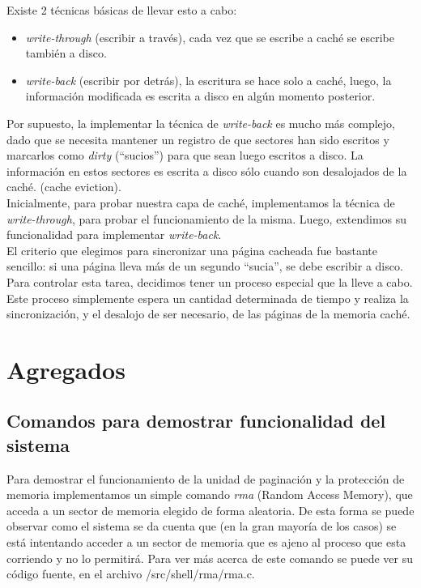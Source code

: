 \documentclass[a4paper,10pt]{article}
\begin{document}
        Existe 2 técnicas básicas de llevar esto a cabo:

        \begin{itemize}
        \item \textit{write-through} (escribir a través), cada vez que se escribe a caché se escribe también a disco.
        \item \textit{write-back} (escribir por detrás), la escritura se hace solo a caché, luego, la información modificada es escrita a disco en algún momento posterior.
        \end{itemize}

        Por supuesto, la implementar la técnica de \textit{write-back} es mucho más complejo, dado que se necesita mantener un registro de que sectores han sido escritos y 
        marcarlos como \textit{dirty} (``sucios'') para que sean luego escritos a disco. La información en estos sectores es escrita a disco sólo cuando son desalojados
        de la caché. (cache eviction). \\

        Inicialmente, para probar nuestra capa de caché, implementamos la técnica de \textit{write-through}, para probar el funcionamiento de la misma. 
        Luego, extendimos su funcionalidad para implementar \textit{write-back}. \\

        El criterio que elegimos para sincronizar una página cacheada fue bastante sencillo: si una página lleva más de un segundo ``sucia'', se debe escribir a disco.
        Para controlar esta tarea, decidimos tener un proceso especial que la lleve a cabo. Este proceso simplemente espera un cantidad determinada de tiempo y realiza 
        la sincronización, y el desalojo de ser necesario, de las páginas de la memoria caché.


\newpage
\section{Agregados}

        \subsection{Comandos para demostrar funcionalidad del sistema}
        
        Para demostrar el funcionamiento de la unidad de paginación y la protección de memoria implementamos un simple comando \textit{rma} (Random Access Memory), 
        que acceda a un sector de memoria elegido de forma aleatoria. De esta forma se puede observar como el sistema se da cuenta que (en la gran mayoría de 
        los casos) se está intentando acceder a un sector de memoria que es ajeno al proceso que esta corriendo y no lo permitirá. Para ver más acerca de este 
        comando se puede ver su código fuente, en el archivo /src/shell/rma/rma.c.\\
\end{document}
